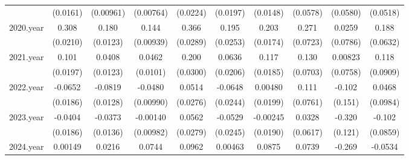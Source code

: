 \begin{table}[htbp]
\begin{tabular}{l*{9}{c}}
                    &    (0.0161)         &   (0.00961)         &   (0.00764)         &    (0.0224)         &    (0.0197)         &    (0.0148)         &    (0.0578)         &    (0.0580)         &    (0.0518)         \\
[1em]
2020.year           &       0.308\sym{***}&       0.180\sym{***}&       0.144\sym{***}&       0.366\sym{***}&       0.195\sym{***}&       0.203\sym{***}&       0.271\sym{***}&      0.0259         &       0.188\sym{***}\\
                    &    (0.0210)         &    (0.0123)         &   (0.00939)         &    (0.0289)         &    (0.0253)         &    (0.0174)         &    (0.0723)         &    (0.0786)         &    (0.0632)         \\
[1em]
2021.year           &       0.101\sym{***}&      0.0408\sym{***}&      0.0462\sym{***}&       0.200\sym{***}&      0.0636\sym{***}&       0.117\sym{***}&       0.130\sym{*}  &     0.00823         &       0.118         \\
                    &    (0.0197)         &    (0.0123)         &    (0.0101)         &    (0.0300)         &    (0.0206)         &    (0.0185)         &    (0.0703)         &    (0.0758)         &    (0.0909)         \\
[1em]
2022.year           &     -0.0652\sym{***}&     -0.0819\sym{***}&     -0.0480\sym{***}&      0.0514\sym{*}  &     -0.0648\sym{***}&     0.00480         &       0.111         &      -0.102         &      0.0468         \\
                    &    (0.0186)         &    (0.0128)         &   (0.00990)         &    (0.0276)         &    (0.0244)         &    (0.0199)         &    (0.0761)         &     (0.151)         &    (0.0984)         \\
[1em]
2023.year           &     -0.0404\sym{**} &     -0.0373\sym{***}&    -0.00140         &      0.0562\sym{**} &     -0.0529\sym{**} &    -0.00245         &      0.0328         &      -0.320\sym{**} &      -0.102         \\
                    &    (0.0186)         &    (0.0136)         &   (0.00982)         &    (0.0279)         &    (0.0245)         &    (0.0190)         &    (0.0617)         &     (0.121)         &    (0.0859)         \\
[1em]
2024.year           &     0.00149         &      0.0216         &      0.0744\sym{***}&      0.0962\sym{***}&     0.00463         &      0.0875\sym{***}&      0.0739         &      -0.269\sym{**} &     -0.0534         \\

\end{tabular}
\end{table}
